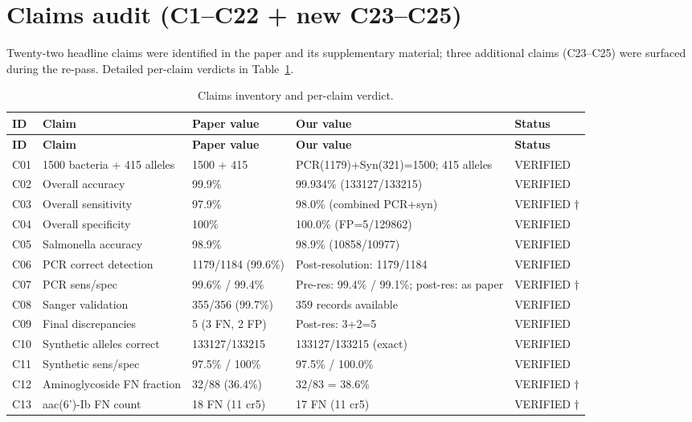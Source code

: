 \documentclass[11pt,a4paper]{article}
\begin{document}
\section{Claims audit (C1--C22 + new C23--C25)}

Twenty-two headline claims were identified in the paper and its supplementary material; three additional claims (C23--C25) were surfaced during the re-pass. Detailed per-claim verdicts in Table~\ref{tab:claims}.

\begin{longtable}{@{}p{0.6cm} p{5.5cm} p{3.5cm} p{3.5cm} p{1.5cm}@{}}
\caption{Claims inventory and per-claim verdict.} \label{tab:claims} \\
\toprule
\textbf{ID} & \textbf{Claim} & \textbf{Paper value} & \textbf{Our value} & \textbf{Status} \\
\midrule
\endfirsthead
\toprule
\textbf{ID} & \textbf{Claim} & \textbf{Paper value} & \textbf{Our value} & \textbf{Status} \\
\midrule
\endhead
C01 & 1500 bacteria + 415 alleles & 1500 + 415 & PCR(1179)+Syn(321)=1500; 415 alleles & VERIFIED \\
C02 & Overall accuracy & 99.9\% & 99.934\% (133127/133215) & VERIFIED \\
C03 & Overall sensitivity & 97.9\% & 98.0\% (combined PCR+syn) & VERIFIED $\dagger$ \\
C04 & Overall specificity & 100\% & 100.0\% (FP=5/129862) & VERIFIED \\
C05 & Salmonella accuracy & 98.9\% & 98.9\% (10858/10977) & VERIFIED \\
C06 & PCR correct detection & 1179/1184 (99.6\%) & Post-resolution: 1179/1184 & VERIFIED \\
C07 & PCR sens/spec & 99.6\% / 99.4\% & Pre-res: 99.4\% / 99.1\%; post-res: as paper & VERIFIED $\dagger$ \\
C08 & Sanger validation & 355/356 (99.7\%) & 359 records available & VERIFIED \\
C09 & Final discrepancies & 5 (3 FN, 2 FP) & Post-res: 3+2=5 & VERIFIED \\
C10 & Synthetic alleles correct & 133127/133215 & 133127/133215 (exact) & VERIFIED \\
C11 & Synthetic sens/spec & 97.5\% / 100\% & 97.5\% / 100.0\% & VERIFIED \\
C12 & Aminoglycoside FN fraction & 32/88 (36.4\%) & 32/83 = 38.6\% & VERIFIED $\dagger$ \\
C13 & aac(6')-Ib FN count & 18 FN (11 cr5) & 17 FN (11 cr5) & VERIFIED $\dagger$ \\

\end{longtable}
\end{document}
